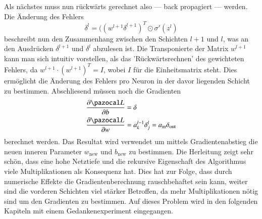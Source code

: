Als nächstes muss nun rückwärts gerechnet also --- back propagiert --- werden. Die Änderung des Fehlers
\begin{equation}
\delta^{l} = ((w^{l+1} \delta^{l+1})^T \odot \sigma'(z^l)
\end{equation}
beschreibt nun den Zusammenhang zwischen den Schichten $l+1$ und $l$, was an den Ausdrücken $\delta^{l+1}$ und $ \delta^{l}$ abzulesen ist. Die Transponierte der Matrix $w^{l+1}$ kann man sich intuitiv vorstellen, als das 'Rückwärtsrechnen' des gewichteten Fehlers, da $w^{l+1} \cdot (w^{l+1})^T = I$, wobei $I$ für die Einheitsmatrix steht. Dies ermöglicht die Änderung des Fehlers pro Neuron in der davor liegenden Schicht zu bestimmen. Abschliesend müssen noch die Gradienten
\begin{equation}
\begin{split}
\frac{\partial \Lb}{\partial b} & = \delta \\
\frac{\partial \Lb}{\partial w} & = a^{l-1}_{k} \delta^{l}_j = a_{\text{in}} \delta_{\text{out}}
\end{split}
\end{equation}
berechnet werden. Das Resultat wird verwendet um mittels Gradientenabstieg die neuen inneren Parameter $w_\text{new}$ und $b_\text{new}$ zu bestimmen.
Die Herleitung zeigt sehr schön, dass eine hohe Netztiefe und die rekursive Eigenschaft des Algorithmus viele Multiplikationen als Konsequenz hat. Dies hat zur Folge, dass durch numerische Effekte die Gradientenberechnung rauschbehaftet sein kann, weiter sind die vorderen Schichten viel stärker Betroffen, da mehr Multiplikationen nötig sind um den Gradienten zu bestimmen. Auf dieses Problem wird in den folgenden Kapiteln mit einem Gedankenexperiment eingegangen.